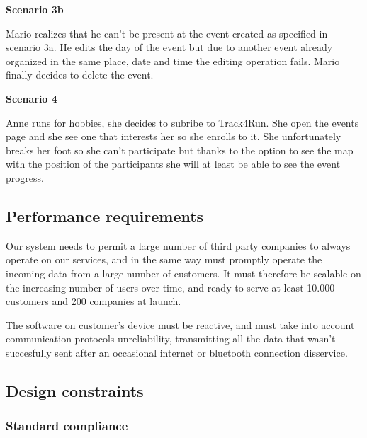 \documentclass[../main.tex]{subfiles}
\begin{document}
		\begin{minipage}{\textwidth}
			{\bf Scenario 3b}
			\vspace{3mm}

			Mario realizes that he can't be present at the event created as specified in scenario 3a. He edits the day of the event but due to another event already organized in the same place, date and time the editing operation fails. Mario finally decides to delete the event.
			\vspace{5mm}
		\end{minipage}
		\begin{minipage}{\textwidth}
			{\bf Scenario 4}
			\vspace{3mm}

			Anne runs for hobbies, she decides to subribe to Track4Run. She open the events page and she see one that interests her so she enrolls to it. She unfortunately breaks her foot so she can't participate but thanks to the option to see the map with the position of the participants she will at least be able to see the event progress.
			\vspace{5mm}
		\end{minipage}


\subsection{Performance requirements}

Our system needs to permit a large number of third party companies to always operate on our services, and in the same way must promptly operate the incoming data from a large number of customers. It must therefore be scalable on the increasing number of users over time, and ready to serve at least 10.000 customers and 200 companies at launch.

The software on customer's device must be reactive, and must take into account communication protocols unreliability, transmitting all the data that wasn't succesfully sent after an occasional internet or bluetooth connection disservice.

\subsection{Design constraints}

\subsubsection{Standard compliance}
\end{document}
